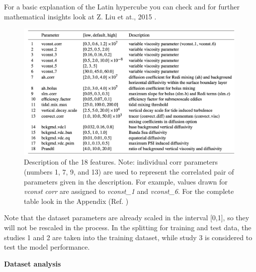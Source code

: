 \documentclass[english,notitlepage,reprint,nofootinbib]{revtex4-1}  %
\begin{document}
For a basic explanation of the Latin hypercube you can check \cite{latinwiki} and for further mathematical insights look at Z. Liu et at., 2015 \cite{latin}.

\begin{figure}[h]
    \centering 
    \includegraphics[scale=0.35]{img/big_table.png}
    \caption{Description of the 18 features. Note: individual corr parameters (numbers 1, 7, 9, and 13) are used to represent the correlated pair of parameters given in the description. For example, values drawn for \textit{vconst corr} are assigned to \textit{vconst_1} and \textit{vconst_6}. For the complete table look in the Appendix (Ref. \cite{failure})}
    \label{fig:big_table}
\end{figure}

Note that the dataset parameters are already scaled in the interval [0,1], so they will not be rescaled in the process. In the splitting for training and test data, the studies 1 and 2 are taken into the training dataset, while study 3 is considered to test the model performance.

\textbf{Dataset analysis}
\end{document}
